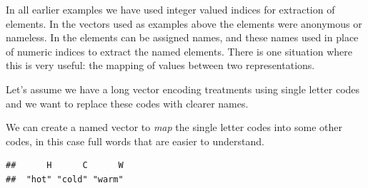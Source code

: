 \documentclass[krantz2]{krantz}\usepackage{knitr}
\begin{document}
\begin{explainbox}
In all earlier examples we have used integer valued indices for extraction of elements. In the vectors used as examples above the elements were anonymous or nameless. In \Rlang the elements can be assigned names, and these names used in place of numeric indices to extract the named elements. There is one situation where this is very useful: the mapping of values between two representations.

Let's assume we have a long vector encoding treatments using single letter codes and we want to replace these codes with clearer names.

\begin{knitrout}\footnotesize
{}\color{fgcolor}\begin{kframe}
\begin{alltt}
 \hlkwb{<-} \hlstd{(}\hlstd{,} \hlstd{,} \hlstd{,} \hlstd{,} \hlstd{,} \hlstd{,} \hlstd{,} \hlstd{,} \hlstd{)}
\end{alltt}
\end{kframe}
\end{knitrout}

We can create a named vector to \emph{map} the single letter codes into some other codes, in this case full words that are easier to understand.

\begin{knitrout}\footnotesize
{}\color{fgcolor}\begin{kframe}
\begin{alltt}
 \hlkwb{<-} \hlstd{(} \hlstd{=} \hlstd{,}  \hlstd{=} \hlstd{,}  \hlstd{=} \hlstd{)}
\end{alltt}
\begin{verbatim}
##      H      C      W 
##  "hot" "cold" "warm"
\end{verbatim}
\end{kframe}
\end{knitrout}

\begin{center}
\begin{small}
\begin{tikzpicture}[font=\sffamily,
array/.style={matrix of nodes,nodes={draw, minimum size=7mm, fill=red!20},column sep=-\pgflinewidth, row sep=0.5mm, nodes in empty cells,
row 1/.style={nodes={draw=none, fill=none, minimum size=5mm}}}]


\end{tikzpicture}
\end{small}
\end{center}
\end{explainbox}
\end{document}

